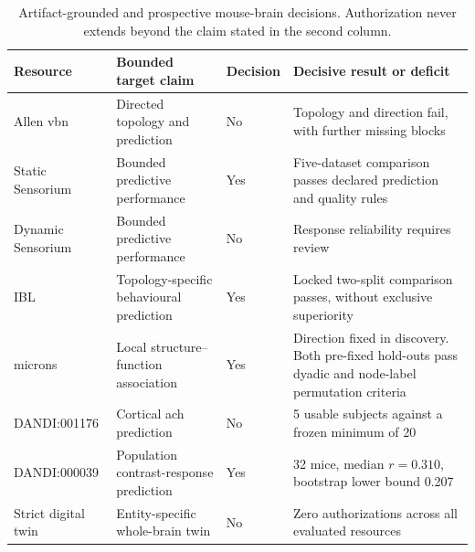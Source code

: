 \begin{table}[H]
\centering
\caption{Artifact-grounded and prospective mouse-brain decisions. Authorization never extends beyond the claim stated in the second column.}
\label{tab:prospective-applications}
\footnotesize
\renewcommand{\arraystretch}{1.08}
\begin{tabularx}{\textwidth}{@{}P{0.17\textwidth}P{0.23\textwidth}P{0.10\textwidth}Y@{}}
\toprule
Resource & Bounded target claim & Decision & Decisive result or deficit \\
\midrule
Allen \ac{vbn} & Directed topology and prediction & No & Topology and direction fail, with further missing blocks \\
Static Sensorium & Bounded predictive performance & Yes & Five-dataset comparison passes declared prediction and quality rules \\
Dynamic Sensorium & Bounded predictive performance & No & Response reliability requires review \\
IBL & Topology-specific behavioural prediction & Yes & Locked two-split comparison passes, without exclusive superiority \\
\ac{microns} & Local structure--function association & Yes & Direction fixed in discovery. Both pre-fixed hold-outs pass dyadic and node-label permutation criteria \\
DANDI:001176 & Cortical \ac{ach} prediction & No & 5 usable subjects against a frozen minimum of 20 \\
DANDI:000039 & Population contrast-response prediction & Yes & 32 mice, median $r=0.310$, bootstrap lower bound 0.207 \\
Strict digital twin & Entity-specific whole-brain twin & No & Zero authorizations across all evaluated resources \\
\bottomrule
\end{tabularx}
\end{table}
